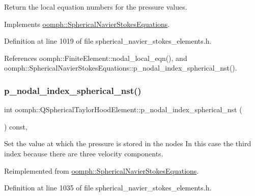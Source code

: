 Return the local equation numbers for the pressure values. 



Implements \hyperlink{classoomph_1_1SphericalNavierStokesEquations_ad8d9a0edbe3793a008a6bff670c26643}{oomph\+::\+Spherical\+Navier\+Stokes\+Equations}.



Definition at line 1019 of file spherical\+\_\+navier\+\_\+stokes\+\_\+elements.\+h.



References oomph\+::\+Finite\+Element\+::nodal\+\_\+local\+\_\+eqn(), and oomph\+::\+Spherical\+Navier\+Stokes\+Equations\+::p\+\_\+nodal\+\_\+index\+\_\+spherical\+\_\+nst().

\mbox{\label{classoomph_1_1QSphericalTaylorHoodElement_a8d7e127d0989233ad2bcd417536b54c0}} 
\subsubsection{\texorpdfstring{p\+\_\+nodal\+\_\+index\+\_\+spherical\+\_\+nst()}{p\_nodal\_index\_spherical\_nst()}}
{\footnotesize\ttfamily int oomph\+::\+Q\+Spherical\+Taylor\+Hood\+Element\+::p\+\_\+nodal\+\_\+index\+\_\+spherical\+\_\+nst (\begin{DoxyParamCaption}{ }\end{DoxyParamCaption}) const\hspace{0.3cm}{\ttfamily [inline]}, {\ttfamily [virtual]}}



Set the value at which the pressure is stored in the nodes In this case the third index because there are three velocity components. 



Reimplemented from \hyperlink{classoomph_1_1SphericalNavierStokesEquations_a7b0edc8eedacaef9e55f3551a7cb5400}{oomph\+::\+Spherical\+Navier\+Stokes\+Equations}.



Definition at line 1035 of file spherical\+\_\+navier\+\_\+stokes\+\_\+elements.\+h.

